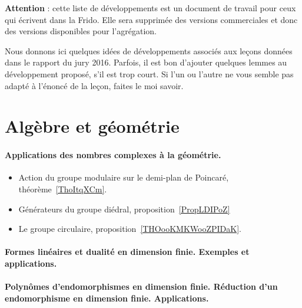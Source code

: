
{\bf Attention } : cette liste de développements est un document de travail pour ceux qui écrivent dans la Frido. Elle sera supprimée des versions commerciales et donc des versions disponibles pour l'agrégation.

\vspace{2cm}


Nous donnons ici quelques idées de développements associés aux leçons données dans le rapport du jury 2016\cite{ooJECQooJvIKEJ}. Parfois, il est bon d'ajouter quelques lemmes au développement proposé, s'il est trop court. Si l'un ou l'autre ne vous semble pas adapté à l'énoncé de la leçon, faites le moi savoir.

\section{Algèbre et géométrie}

\paragraph{Applications des nombres complexes à la géométrie.}
\begin{itemize}
    \item Action du groupe modulaire sur le demi-plan de Poincaré, théorème~\ref{ThoItqXCm}.
    \item Générateurs du groupe diédral, proposition~\ref{PropLDIPoZ}
    \item Le groupe circulaire, proposition~\ref{THOooKMKWooZPIDaK}.
\end{itemize}
\paragraph{Formes linéaires et dualité en dimension finie. Exemples et applications.}
\paragraph{Polynômes d'endomorphismes en dimension finie. Réduction d'un endomorphisme en dimension finie. Applications.}
